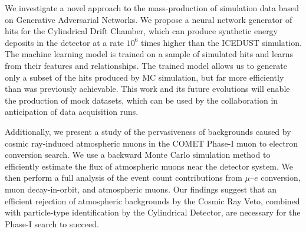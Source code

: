 We investigate a novel approach to the mass-production of simulation data based
on Generative Adversarial Networks. We propose a neural network generator of
hits for the Cylindrical Drift Chamber, which can produce synthetic energy
deposits in the detector at a rate $10^6$ times higher than the ICEDUST
simulation. The machine learning model is trained on a sample of simulated hits
and learns from their features and relationships. The trained model allows us to
generate only a subset of the hits produced by MC simulation, but far more
efficiently than was previously achievable. This work and its future evolutions
will enable the production of mock datasets, which can be used by the
collaboration in anticipation of data acquisition runs.

Additionally, we present a study of the pervasiveness of backgrounds caused by
cosmic ray-induced atmospheric muons in the COMET Phase-I muon to electron
conversion search. We use a backward Monte Carlo simulation method to
efficiently estimate the flux of atmospheric muons near the detector system. We
then perform a full analysis of the event count contributions from $\mu$--$e$
conversion, muon decay-in-orbit, and atmospheric muons. Our findings suggest
that an efficient rejection of atmospheric backgrounds by the Cosmic Ray Veto,
combined with particle-type identification by the Cylindrical Detector, are
necessary for the Phase-I search to succeed.


